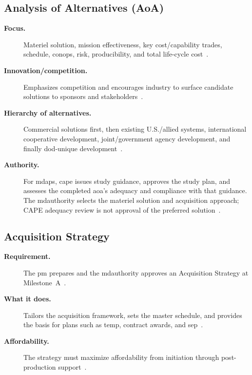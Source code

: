 \documentclass[../main.tex]{subfiles}
\begin{document}
\subsection{Analysis of Alternatives (AoA)}
\begin{description}
  \item[\textbf{Focus.}] Materiel solution, mission effectiveness, key cost/capability trades, schedule, \ac{conops}, risk, producibility, and total life-cycle cost~\autocite{DoDI5000-85,USC-10-4251,edo-3-3-2-acq-milestones-phases-2025}.
  \item[\textbf{Innovation/competition.}] Emphasizes competition and encourages industry to surface candidate solutions to sponsors and stakeholders~\autocite{edo-3-3-2-acq-milestones-phases-2025}.
  \item[\textbf{Hierarchy of alternatives.}] Commercial solutions first, then existing U.S./allied systems, international cooperative development, joint/government agency development, and finally \ac{dod}-unique development~\autocite{edo-3-3-2-acq-milestones-phases-2025}.
  \item[\textbf{Authority.}] For \acp{mdap}, \ac{cape} issues study guidance, approves the study plan, and assesses the completed \ac{aoa}'s adequacy and compliance with that guidance. The \ac{mdauthority} selects the materiel solution and acquisition approach; CAPE adequacy review is not approval of the preferred solution~\autocite{DoDI5000-84,DoDI5000-85}.
\end{description}

\subsection{Acquisition Strategy}
\begin{description}
  \item[\textbf{Requirement.}] The \ac{pm} prepares and the \ac{mdauthority} approves an Acquisition Strategy at Milestone~A~\autocite{DoDI5000-85,edo-3-3-2-acq-milestones-phases-2025}.
  \item[\textbf{What it does.}] Tailors the acquisition framework, sets the master schedule, and provides the basis for plans such as \ac{temp}, contract awards, and \ac{sep}~\autocite{DoDI5000-02,DoDI5000-85,edo-3-3-2-acq-milestones-phases-2025}.
  \item[\textbf{Affordability.}] The strategy must maximize affordability from initiation through post-production support~\autocite{DoDI5000-85,edo-3-3-2-acq-milestones-phases-2025}.
\end{description}
\end{document}

